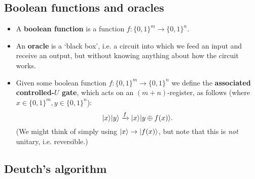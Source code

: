 \documentclass[10pt]{article}
\DeclarePairedDelimiter\ket{\lvert}{\rangle}
\begin{document}
        \subsection{Boolean functions and oracles}

            \begin{itemize}
                \item A \textbf{boolean function} is a function $f\colon\{0,1\}^m\to\{0,1\}^n$.
                \item An \textbf{oracle} is a `black box', i.e. a circuit into which we feed an input and receive an output, but without knowing anything about how the circuit works.
                \item Given some boolean function $f\colon\{0,1\}^m\to\{0,1\}^n$ we define the \textbf{associated controlled-$U$ gate}, which acts on an $(m+n)$-register, as follows (where $x\in\{0,1\}^m,y\in\{0,1\}^n$):
                    \begin{equation*}
                        \ket{x}\ket{y}\xrightarrow{f}\ket{x}\ket{y\oplus f(x)}.
                    \end{equation*}
                    (We might think of simply using $\ket{x}\to\ket{f(x)}$, but note that this is \emph{not} unitary, i.e. reversible.)
            \end{itemize}

        \subsection{Deutch's algorithm}
\end{document}
